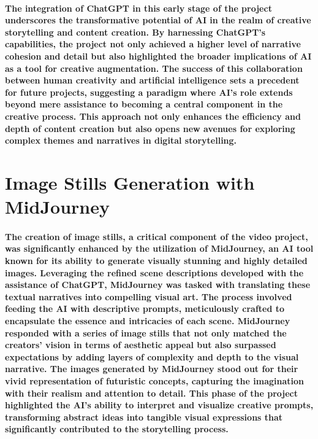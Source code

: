 \documentclass[11pt,a4paper,oneside]{report}
\begin{document}
\paragraph{The integration of ChatGPT in this early stage of the project underscores the transformative potential of AI in the realm of creative storytelling and content creation. By harnessing ChatGPT's capabilities, the project not only achieved a higher level of narrative cohesion and detail but also highlighted the broader implications of AI as a tool for creative augmentation. The success of this collaboration between human creativity and artificial intelligence sets a precedent for future projects, suggesting a paradigm where AI's role extends beyond mere assistance to becoming a central component in the creative process. This approach not only enhances the efficiency and depth of content creation but also opens new avenues for exploring complex themes and narratives in digital storytelling.}

\section{Image Stills Generation with MidJourney}

\paragraph{The creation of image stills, a critical component of the video project, was significantly enhanced by the utilization of MidJourney, an AI tool known for its ability to generate visually stunning and highly detailed images. Leveraging the refined scene descriptions developed with the assistance of ChatGPT, MidJourney was tasked with translating these textual narratives into compelling visual art. The process involved feeding the AI with descriptive prompts, meticulously crafted to encapsulate the essence and intricacies of each scene. MidJourney responded with a series of image stills that not only matched the creators' vision in terms of aesthetic appeal but also surpassed expectations by adding layers of complexity and depth to the visual narrative. The images generated by MidJourney stood out for their vivid representation of futuristic concepts, capturing the imagination with their realism and attention to detail. This phase of the project highlighted the AI's ability to interpret and visualize creative prompts, transforming abstract ideas into tangible visual expressions that significantly contributed to the storytelling process.}
\end{document}
